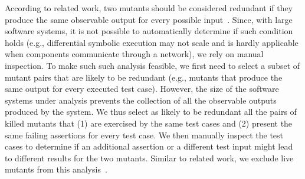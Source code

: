 According to related work, two mutants should be considered redundant if they produce the same observable output for every possible input~\cite{Shin:TSE:DCriterion:2018}.
Since, with large software systems, it is not possible to automatically determine if such condition holds (e.g., differential symbolic execution may not scale and is hardly applicable when components communicate through a network), we rely on manual inspection. To make such such analysis feasible, we first need to select a subset of mutant pairs that are likely to be redundant (e.g., mutants that produce the same output for every executed test case).
However, the size of the software systems under analysis prevents the collection of all the observable outputs produced by the system.
We thus select as likely to be redundant all the pairs of killed mutants that (1) are exercised by the same test cases and (2) present the same failing assertions for every test case. We then manually inspect the test cases to determine if an additional assertion or a different test input might lead to different results for the two mutants. Similar to related work, we exclude live mutants from this analysis~\cite{papadakis2016threats}.

